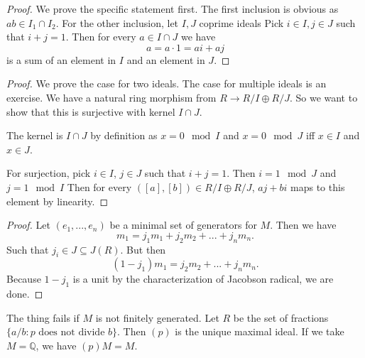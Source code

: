 \begin{proof}
    We prove the specific statement first. The first inclusion is obvious as $ab\in I_1\cap I_2$. For the other inclusion, let $I,J$ coprime ideals
    Pick $i\in I, j\in J$ such that $i+j=1$.
    Then for every $a\in I\cap J$ we have \[
    a=a\cdot 1 = ai + aj
    \]
    is a sum of an element in $I$ and an element in $J$.
\end{proof}
\begin{proof}
    We prove the case for two ideals. The case for multiple ideals is an exercise. 
    We have a natural ring morphism from $R\to R/I \oplus R/J$. So we want to show that this is surjective with kernel $I\cap J$. 

    The kernel is $I\cap J$ by definition as $x=0\mod I$ and $x=0\mod J$ iff $x\in I$ and $x\in J$.

    For surjection, pick $i\in I$, $j\in J$ such that $i+j=1$. 
    Then $i=1 \mod J$ and $j=1 \mod I$
    Then for every $([a],[b])\in R/I\oplus R/J$,
    $aj+bi$ maps to this element by linearity. 
\end{proof}

\begin{proof}
    Let $(e_1,...,e_n)$ be a minimal set of generators for $M$.
    Then we have \[
    m_1=j_1m_1+j_2m_2+...+j_nm_n.
    \]
    Such that $j_i\in J\subseteq J(R)$.
    But then\[
    (1-j_1)m_1= j_2m_2+...+j_nm_n.
    \]
    Because $1-j_1$ is a unit by the characterization of Jacobson radical, we are done.
\end{proof}
\begin{remark}
    The thing fails if $M$ is not finitely generated. Let $R$ be the set of fractions $\{a/b: p \textrm{ does not divide }b\}$. Then $(p)$ is the unique maximal ideal. If we take $M=\mathbb{Q}$, we have $(p)M =M$. 
\end{remark}